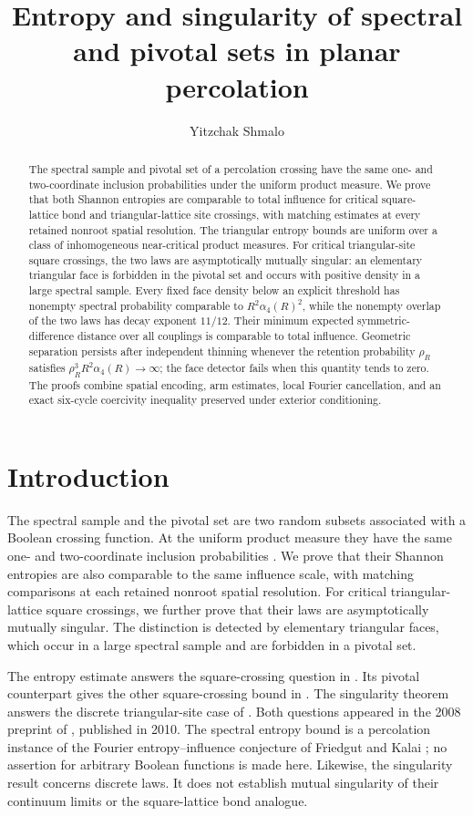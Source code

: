 \documentclass[11pt]{amsart}
\title[Entropy and singularity in percolation]{Entropy and singularity of spectral and pivotal sets in planar percolation}
\author{Yitzchak Shmalo}
\date{}
\theoremstyle{remark}
\begin{document}
\begin{abstract}
The spectral sample and pivotal set of a percolation crossing have the same one- and two-coordinate inclusion probabilities under the uniform product measure. We prove that both Shannon entropies are comparable to total influence for critical square-lattice bond and triangular-lattice site crossings, with matching estimates at every retained nonroot spatial resolution. The triangular entropy bounds are uniform over a class of inhomogeneous near-critical product measures. For critical triangular-site square crossings, the two laws are asymptotically mutually singular: an elementary triangular face is forbidden in the pivotal set and occurs with positive density in a large spectral sample. Every fixed face density below an explicit threshold has nonempty spectral probability comparable to $R^2\alpha_4(R)^2$, while the nonempty overlap of the two laws has decay exponent $11/12$. Their minimum expected symmetric-difference distance over all couplings is comparable to total influence. Geometric separation persists after independent thinning whenever the retention probability $\rho_R$ satisfies $\rho_R^3R^2\alpha_4(R)\to\infty$; the face detector fails when this quantity tends to zero. The proofs combine spatial encoding, arm estimates, local Fourier cancellation, and an exact six-cycle coercivity inequality preserved under exterior conditioning.
\end{abstract}
\maketitle
\enlargethispage{4pt}
\section{Introduction}

The spectral sample and the pivotal set are two random subsets associated with a Boolean crossing function. At the uniform product measure they have the same one- and two-coordinate inclusion probabilities \cite[equation~(2.13)]{GPS}. We prove that their Shannon entropies are also comparable to the same influence scale, with matching comparisons at each retained nonroot spatial resolution. For critical triangular-lattice square crossings, we further prove that their laws are asymptotically mutually singular. The distinction is detected by elementary triangular faces, which occur in a large spectral sample and are forbidden in a pivotal set.

The entropy estimate answers the square-crossing question in \cite[Section~11, Question~1]{GPS}. Its pivotal counterpart gives the other square-crossing bound in \cite[Conjecture~8]{Kalai}. The singularity theorem answers the discrete triangular-site case of \cite[Section~11, Question~5]{GPS}. Both questions appeared in the 2008 preprint of \cite{GPS}, published in 2010. The spectral entropy bound is a percolation instance of the Fourier entropy--influence conjecture of Friedgut and Kalai \cite{FK}; no assertion for arbitrary Boolean functions is made here. Likewise, the singularity result concerns discrete laws. It does not establish mutual singularity of their continuum limits or the square-lattice bond analogue.
\end{document}
